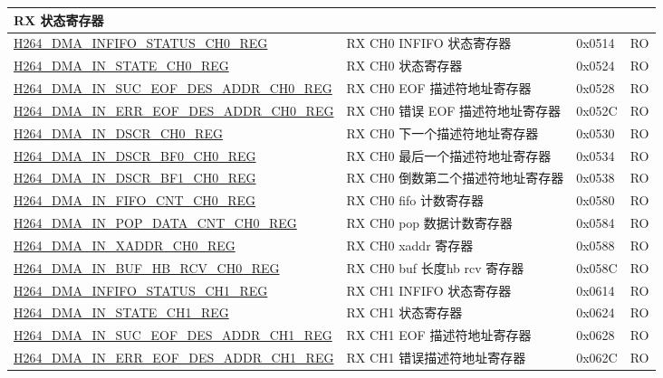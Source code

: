 \begin{longtable}{ | p{7.5cm} | p{5.7cm} | p{1.2cm} | p{1cm} | }
\multicolumn{4}{|l|}{\textbf{RX 状态寄存器}} \\ \hline
    \hyperref[regdesc:H264DMAINFIFOSTATUSCH0REG]{H264\_DMA\_INFIFO\_STATUS\_CH0\_REG} & RX CH0 INFIFO 状态寄存器 & 0x0514 & RO \\ \hline
    \hyperref[regdesc:H264DMAINSTATECH0REG]{H264\_DMA\_IN\_STATE\_CH0\_REG} & RX CH0 状态寄存器 & 0x0524 & RO \\ \hline
    \hyperref[regdesc:H264DMAINSUCEOFDESADDRCH0REG]{H264\_DMA\_IN\_SUC\_EOF\_DES\_ADDR\_CH0\_REG} & RX CH0 EOF 描述符地址寄存器 & 0x0528 & RO \\ \hline
    \hyperref[regdesc:H264DMAINERREOFDESADDRCH0REG]{H264\_DMA\_IN\_ERR\_EOF\_DES\_ADDR\_CH0\_REG} & RX CH0 错误 EOF 描述符地址寄存器 & 0x052C & RO \\ \hline
    \hyperref[regdesc:H264DMAINDSCRCH0REG]{H264\_DMA\_IN\_DSCR\_CH0\_REG} & RX CH0 下一个描述符地址寄存器 & 0x0530 & RO \\ \hline
    \hyperref[regdesc:H264DMAINDSCRBF0CH0REG]{H264\_DMA\_IN\_DSCR\_BF0\_CH0\_REG} & RX CH0 最后一个描述符地址寄存器 & 0x0534 & RO \\ \hline
    \hyperref[regdesc:H264DMAINDSCRBF1CH0REG]{H264\_DMA\_IN\_DSCR\_BF1\_CH0\_REG} & RX CH0 倒数第二个描述符地址寄存器 & 0x0538 & RO \\ \hline
    \hyperref[regdesc:H264DMAINFIFOCNTCH0REG]{H264\_DMA\_IN\_FIFO\_CNT\_CH0\_REG} & RX CH0 fifo 计数寄存器 & 0x0580 & RO \\ \hline
    \hyperref[regdesc:H264DMAINPOPDATACNTCH0REG]{H264\_DMA\_IN\_POP\_DATA\_CNT\_CH0\_REG} & RX CH0 pop 数据计数寄存器 & 0x0584 & RO \\ \hline
    \hyperref[regdesc:H264DMAINXADDRCH0REG]{H264\_DMA\_IN\_XADDR\_CH0\_REG} & RX CH0 xaddr 寄存器 & 0x0588 & RO \\ \hline
    \hyperref[regdesc:H264DMAINBUFHBRCVCH0REG]{H264\_DMA\_IN\_BUF\_HB\_RCV\_CH0\_REG} & RX CH0 buf 长度hb rcv 寄存器 & 0x058C & RO \\ \hline
    \hyperref[regdesc:H264DMAINFIFOSTATUSCH1REG]{H264\_DMA\_INFIFO\_STATUS\_CH1\_REG} & RX CH1 INFIFO 状态寄存器 & 0x0614 & RO \\ \hline
    \hyperref[regdesc:H264DMAINSTATECH1REG]{H264\_DMA\_IN\_STATE\_CH1\_REG} & RX CH1 状态寄存器 & 0x0624 & RO \\ \hline
    \hyperref[regdesc:H264DMAINSUCEOFDESADDRCH1REG]{H264\_DMA\_IN\_SUC\_EOF\_DES\_ADDR\_CH1\_REG} & RX CH1 EOF 描述符地址寄存器 & 0x0628 & RO \\ \hline
    \hyperref[regdesc:H264DMAINERREOFDESADDRCH1REG]{H264\_DMA\_IN\_ERR\_EOF\_DES\_ADDR\_CH1\_REG} & RX CH1 错误描述符地址寄存器 & 0x062C & RO \\ \hline

\end{longtable}
